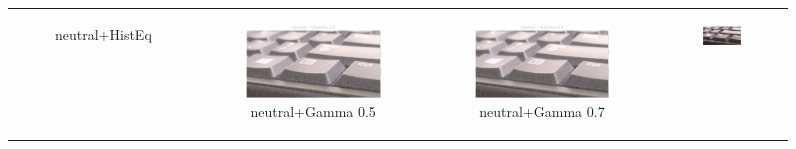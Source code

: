 \documentclass[11pt, a4]{article}
\begin{document}
\begin{enumerate}
\begin{figure}[H]
{\begin{tabular}{cccc}
\begin{subfigure}[h]{0.45\linewidth}
							\caption{neutral+HistEq}
							\label{fig:RawImage2_tone_9}
						\end{subfigure} &
						\begin{subfigure}[h]{0.45\linewidth}
							\centering
							\includegraphics[width=\linewidth]{../output/RawImage2_Tone_neutral_Gamma0.5.pdf}
							\caption{neutral+Gamma 0.5}
							\label{fig:RawImage2_tone_10}
						\end{subfigure} &
						\begin{subfigure}[h]{0.45\linewidth}
							\centering
							\includegraphics[width=\linewidth]{../output/RawImage2_Tone_neutral_Gamma0.5.pdf}
							\caption{neutral+Gamma 0.7}
							\label{fig:RawImage2_tone_11}
						\end{subfigure} &
						\begin{subfigure}[h]{0.45\linewidth}
							\centering
							\includegraphics[width=\linewidth]{../output/RawImage2_Tone_neutral_Gamma0.9.pdf}

\end{subfigure}
\end{tabular}}
\end{figure}
\end{enumerate}
\end{document}
